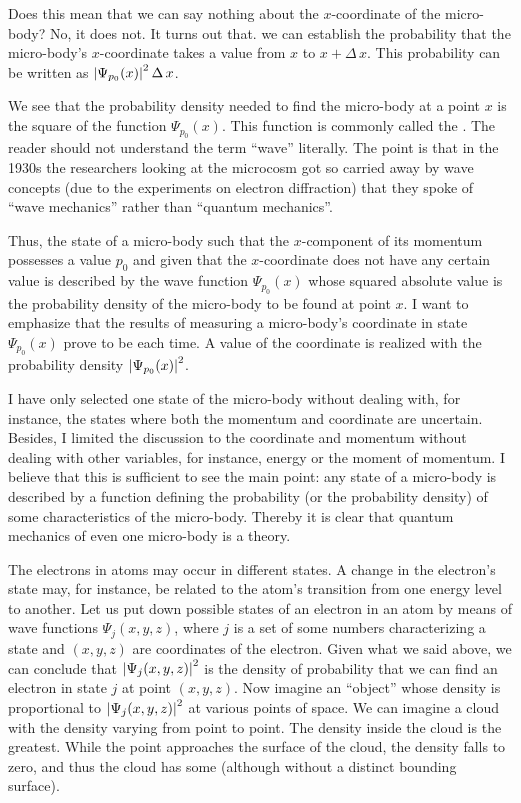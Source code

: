 Does this mean that we can say nothing about the $x$-coordinate of the
micro-body? No, it does not. It turns out that. we can establish the
probability that the micro-body's $x$-coordinate takes a value from $x$ to
$x + \Delta \, x$. This probability can be written as $\abs{\Psi_{p_{0}}  (x)}^{2} \, \Delta \, x$.

We see that the probability density needed to find the micro-body at
a point $x$ is the square of the function $\Psi_{p_{0}}  (x)$. This function is
commonly called the . The reader should not understand the term ``wave'' literally. The point is that in the 1930s the researchers looking at the microcosm got so carried away by wave concepts (due to the experiments on electron diffraction) that they spoke of ``wave 	mechanics'' rather than ``quantum mechanics''.

Thus, the state of a micro-body such that the $x$-component of its
momentum possesses a value $p_{0}$ and given that the $x$-coordinate does not have any certain value is described by the wave function $\Psi_{p_{0}} (x)$ whose squared absolute value is the probability density of the
micro-body to be found at point $x$. I want to emphasize that the results
of measuring a micro-body's coordinate in state $\Psi_{p_{0}} (x)$ prove to be  each time. A value of the coordinate is realized with the
probability density $\abs{\Psi_{p_{0}}  (x)}^{2}$.

I have only selected one state of the micro-body without dealing with,
for instance, the states where both the momentum and coordinate are
uncertain. Besides, I limited the discussion to the coordinate and
momentum without dealing with other variables, for instance, energy or
the moment of momentum. I believe that this is sufficient to see the
main point: any state of a micro-body is described by a function defining
the probability (or the probability density) of some characteristics of the
micro-body. Thereby it is clear that quantum mechanics of even one
micro-body is a  theory.

 The electrons in atoms may occur in
different states. A change in the electron's state may, for instance, be
related to the atom's transition from one energy level to another. Let us
put down possible states of an electron in an atom by means of wave
functions $\Psi_{j}(x, y, z)$, where $j$ is a set of some numbers characterizing a state and $(x, y, z)$ are coordinates of the electron. Given what we said above, we can conclude that $\abs{\Psi_{j}(x, y, z)}^{2}$ is the density of probability that we can find an electron in state $j$ at point $(x, y, z)$. Now imagine an ``object'' whose density is proportional to $\abs{\Psi_{j}(x, y, z)}^{2}$ at various points of space. We can imagine a cloud with the density varying from point to point. The density inside the cloud is the greatest. While the point approaches the surface of the cloud, the density falls to zero, and thus the cloud has some  (although without a distinct bounding surface).


